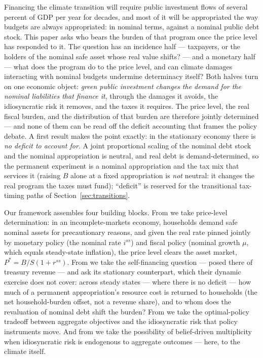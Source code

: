 \documentclass[12pt]{article}
\newcommand{\Sfun}{S}
\begin{document}
Financing the climate transition will require public investment flows of
several percent of GDP per year for decades, and most of it will be
appropriated the way budgets are always appropriated: in nominal terms,
against a nominal public debt stock. This paper asks who bears
the burden of that program once the price level has responded to it. The
question has an incidence half --- taxpayers, or the holders of the nominal
safe asset whose real value shifts? --- and a monetary half --- what does the
program do to the price level, and can climate damages interacting with
nominal budgets undermine determinacy itself? Both halves turn on one
economic object: \emph{green public investment changes the demand for the
nominal liabilities that finance it}, through the damages it avoids, the
idiosyncratic risk it removes, and the taxes it requires. The price level,
the real fiscal burden, and the distribution of that burden are therefore
jointly determined --- and none of them can be read off the deficit
accounting that frames the policy debate. A first result makes the point
exactly: in the stationary economy there is \emph{no deficit to account for}.
A joint proportional scaling of the nominal debt stock and the nominal
appropriation is neutral, and real debt is demand-determined, so the
permanent experiment is a nominal appropriation and the tax mix that services
it (raising $B$ alone at a fixed appropriation is \emph{not} neutral: it
changes the real program the taxes must fund); ``deficit'' is reserved for the transitional tax-timing paths of
Section~\ref{sec:transitions}.

Our framework assembles four building blocks. From \citet{hagedorn2026dtpl}
we take price-level determination: in an incomplete-markets economy,
households demand safe nominal assets for precautionary reasons, and given
the real rate pinned jointly by monetary policy (the nominal rate $i^{ss}$)
and fiscal policy (nominal growth $\mu$, which equals steady-state
inflation), the price level clears the asset market,
$P^{*}=B/\Sfun(1+r^{ss})$. From \citet{angeletos2024deficits} we take the
self-financing question --- posed there of treasury revenue --- and ask its
stationary counterpart, which their dynamic exercise does not cover: across
steady states --- where there is no deficit --- how much of a permanent
appropriation's resource cost is returned to households (the net
household-burden offset, not a revenue share), and to whom does the
revaluation of nominal debt shift the burden? From \citet{acharya2023optimal}
we take the optimal-policy tradeoff between aggregate objectives and the
idiosyncratic risk that policy instruments move. And from
\citet{acharyabenhabib2024} we take the possibility of belief-driven
multiplicity when idiosyncratic risk is endogenous to aggregate outcomes ---
here, to the climate itself.
\end{document}
